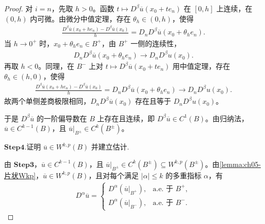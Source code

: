 \documentclass[../../main.tex]{subfiles}
\begin{document}
\begin{proof}
对 $i=n$，先取 $h>0$。函数 $t\mapsto D^{\beta}\overline{u}(x_0+te_n)$ 在 $[0,h]$ 上连续，在 $(0,h)$ 内可微。由微分中值定理，存在 $\theta_h\in(0,h)$，使得
\begin{align*}
\frac{D^{\beta}\overline{u}(x_0+he_n)-D^{\beta}\overline{u}(x_0)}{h}
=D_nD^{\beta}\overline{u}(x_0+\theta_he_n).
\end{align*}
当 $h\to0^{+}$ 时，$x_0+\theta_he_n\in B^{+}$，由 $B^{+}$ 一侧的连续性，
\begin{align*}
D_nD^{\beta}\overline{u}(x_0+\theta_he_n)\longrightarrow D_nD^{\beta}u(x_0).
\end{align*}
再取 $h<0$。同理，在 $B^{-}$ 上对 $t\mapsto D^{\beta}\overline{u}(x_0+te_n)$ 用中值定理，存在 $\theta_h\in(h,0)$，使得
\begin{align*}
\frac{D^{\beta}\overline{u}(x_0+he_n)-D^{\beta}\overline{u}(x_0)}{h}
=D_nD^{\beta}\overline{u}(x_0+\theta_he_n)\longrightarrow D_nD^{\beta}u(x_0).
\end{align*}
故两个单侧差商极限相同，$D_nD^{\beta}\overline{u}(x_0)$ 存在且等于 $D_nD^{\beta}u(x_0)$。

于是 $D^{\beta}\overline{u}$ 的一阶偏导数在 $B$ 上存在且连续，即 $D^{\beta}\overline{u}\in C^{1}(B)$。由归纳法，$\overline{u}\in C^{k-1}(B)$，且 $\overline{u}|_{B^{\pm}}\in C^{k}(B^{\pm})$。

\noindent$\mathbf{Step}\bm{4}$.{\heiti 证明 $\overline{u}\in W^{k,p}(B)$ 并建立估计.}

由 $\mathbf{Step}\bm{3}$，$\overline{u}\in C^{k-1}(B)$，且 $\overline{u}|_{B^{\pm}}\in C^{k}(B^{\pm})\subseteq W^{k,p}(B^{\pm})$。由\cref{lemma:ch05-片状Wkp}，$\overline{u}\in W^{k,p}(B)$，且对每个满足 $|\alpha|\leqslant k$ 的多重指标 $\alpha$，有
\begin{align*}
D^{\alpha}\overline{u}=
\begin{cases}
D^{\alpha}(\overline{u}|_{B^{+}}), & \text{a.e. 于 }B^{+},\\
D^{\alpha}(\overline{u}|_{B^{-}}), & \text{a.e. 于 }B^{-}.
\end{cases}
\end{align*}


\end{proof}
\end{document}
